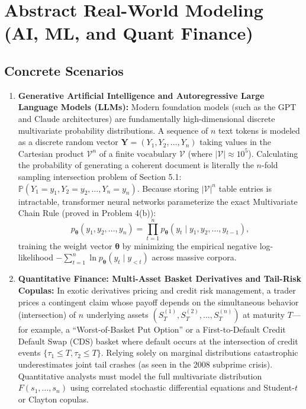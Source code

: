 \documentclass[11pt, letterpaper]{article}
\theoremstyle{definition}
\theoremstyle{remark}
\newcommand{\Prob}{\mathbb{P}}
\begin{document}
\newpage
\section{Abstract Real-World Modeling (AI, ML, and Quant Finance)}

\subsection{Concrete Scenarios}

\begin{enumerate}[label=\textbf{Scenario \arabic*:}]
    \item \textbf{Generative Artificial Intelligence and Autoregressive Large Language Models (LLMs):}
    Modern foundation models (such as the GPT and Claude architectures) are fundamentally high-dimensional discrete multivariate probability distributions. A sequence of $n$ text tokens is modeled as a discrete random vector $\mathbf{Y} = (Y_1, Y_2, \dots, Y_n)$ taking values in the Cartesian product $\mathcal{V}^n$ of a finite vocabulary $\mathcal{V}$ (where $|\mathcal{V}| \approx 10^5$). Calculating the probability of generating a coherent document is literally the $n$-fold sampling intersection problem of Section 5.1: $\Prob(Y_1 = y_1, Y_2 = y_2, \dots, Y_n = y_n)$. Because storing $|\mathcal{V}|^n$ table entries is intractable, transformer neural networks parameterize the exact Multivariate Chain Rule (proved in Problem 4(b)):
    \[
    p_{\boldsymbol{\theta}}(y_1, y_2, \dots, y_n) = \prod_{t=1}^{n} p_{\boldsymbol{\theta}}(y_t \mid y_1, y_2, \dots, y_{t-1}),
    \]
    training the weight vector $\boldsymbol{\theta}$ by minimizing the empirical negative log-likelihood $-\sum_{t=1}^n \ln p_{\boldsymbol{\theta}}(y_t \mid y_{<t})$ across massive corpora.

    \item \textbf{Quantitative Finance: Multi-Asset Basket Derivatives and Tail-Risk Copulas:}
    In exotic derivatives pricing and credit risk management, a trader prices a contingent claim whose payoff depends on the simultaneous behavior (intersection) of $n$ underlying assets $(S_T^{(1)}, S_T^{(2)}, \dots, S_T^{(n)})$ at maturity $T$—for example, a ``Worst-of-Basket Put Option'' or a First-to-Default Credit Default Swap (CDS) basket where default occurs at the intersection of credit events $\{\tau_1 \le T, \tau_2 \le T\}$. Relying solely on marginal distributions catastrophic underestimates joint tail crashes (as seen in the 2008 subprime crisis). Quantitative analysts must model the full multivariate distribution $F(s_1, \dots, s_n)$ using correlated stochastic differential equations and Student-$t$ or Clayton copulas.


\end{enumerate}
\end{document}
